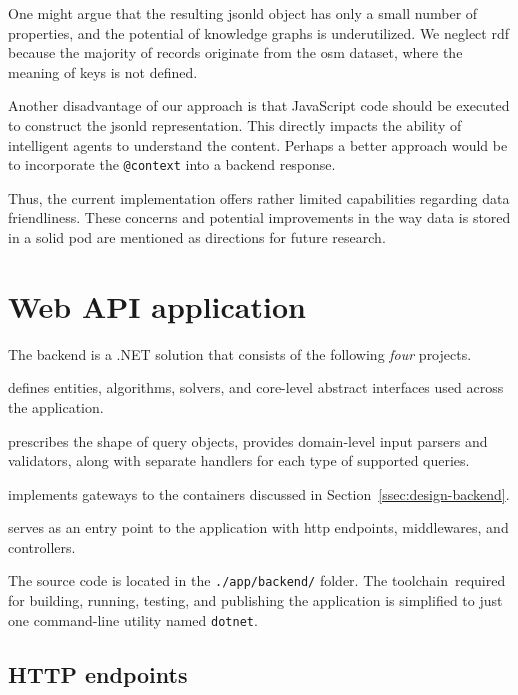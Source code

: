 One might argue that the resulting \acs{jsonld} object has only a small number of properties, and the potential of knowledge graphs is underutilized. We neglect \acs{rdf} because the majority of records originate from the \acs{osm} dataset, where the meaning of keys is not defined.

Another disadvantage of our approach is that JavaScript code should be ex\-e\-cut\-ed to construct the \acs{jsonld} representation. This directly impacts the ability of intelligent agents to understand the content. Perhaps a better approach would be to incorporate the \texttt{@context} into a backend response.

Thus, the current implementation offers rather limited capabilities regarding data friendliness. These concerns and potential improvements in the way data is stored in a \acs{solid} pod are mentioned as directions for future research.

\section{Web API application}

The backend is a .NET solution that consists of the following \emph{four} projects.

\begin{description}[font=\tt]
\item[SmartWalk.Core] defines entities, algorithms, solvers, and core-level abstract interfaces used across the application.
\item[SmartWalk.Application] prescribes the shape of query objects, provides domain-level input parsers and validators, along with separate handlers for each type of supported queries.
\item[SmartWalk.Infrastructure] implements gateways to the containers discussed in Section~\ref{ssec:design-backend}.
\item[SmartWalk.Api] serves as an entry point to the application with \acs{http} endpoints, middlewares, and controllers.
\end{description}

The source code is located in the \texttt{./app/backend/} folder. The toolchain~required for building, running, testing, and publishing the application is simplified to just one command-line utility named \texttt{dotnet}.

\subsection{HTTP endpoints}\label{ssec:http-endpoints}

